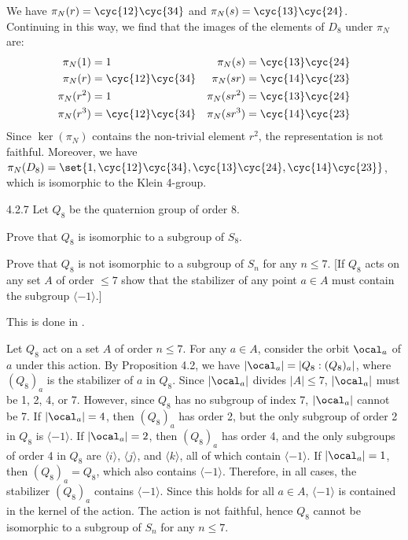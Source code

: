 \begin{sol}
	We have $\pi_N(r) = \cyc{1 2}\cyc{3 4}$ and $\pi_N(s) = \cyc{1 3}\cyc{2 4}$.
	Continuing in this way, we find that the images of the elements of $D_8$ under $\pi_N$ are:
	\begin{align*}
		\pi_N(1) & = 1 & \pi_N(s) & = \cyc{1 3}\cyc{2 4} \\
		\pi_N(r) & = \cyc{1 2}\cyc{3 4} & \pi_N(sr) & = \cyc{1 4}\cyc{2 3} \\
		\pi_N(r^2) & = 1 & \pi_N(sr^2) & = \cyc{1 3}\cyc{2 4} \\
		\pi_N(r^3) & = \cyc{1 2}\cyc{3 4} & \pi_N(sr^3) & = \cyc{1 4}\cyc{2 3}
	\end{align*}
	Since $\ker(\pi_N)$ contains the non-trivial element $r^2$, the representation is not faithful.
	Moreover, we have $\pi_N(D_8) = \set{1, \cyc{1 2}\cyc{3 4}, \cyc{1 3}\cyc{2 4}, \cyc{1 4}\cyc{2 3}}$, which is isomorphic to the Klein 4-group.
\end{sol}

\begin{exercise}{4.2.7}
	Let $Q_8$ be the quaternion group of order 8.
	\begin{subexercises}
		\item Prove that $Q_8$ is isomorphic to a subgroup of $S_8$.
		\item Prove that $Q_8$ is not isomorphic to a subgroup of $S_n$ for any $n \le 7$. [If $Q_8$ acts on any set $A$ of order $\le 7$ show that the stabilizer of any point $a \in A$ must contain the subgroup $\langle -1 \rangle$.]
	\end{subexercises}
\end{exercise}

\begin{solenum}
	\item This is done in .
	\item Let $Q_8$ act on a set $A$ of order $n \leq 7$.
	For any $a \in A$, consider the orbit $\ocal_a$ of $a$ under this action.
	By Proposition 4.2, we have $|\ocal_a| = |Q_8 : (Q_8)_a|$, where $(Q_8)_a$ is the stabilizer of $a$ in $Q_8$.
	Since $|\ocal_a|$ divides $|A| \leq 7$, $|\ocal_a|$ must be 1, 2, 4, or 7.
	However, since $Q_8$ has no subgroup of index 7, $|\ocal_a|$ cannot be 7.
	If $|\ocal_a| = 4$, then $(Q_8)_a$ has order 2, but the only subgroup of order 2 in $Q_8$ is $\langle -1 \rangle$.
	If $|\ocal_a| = 2$, then $(Q_8)_a$ has order 4, and the only subgroups of order 4 in $Q_8$ are $\langle i \rangle$, $\langle j \rangle$, and $\langle k \rangle$, all of which contain $\langle -1 \rangle$.
	If $|\ocal_a| = 1$, then $(Q_8)_a = Q_8$, which also contains $\langle -1 \rangle$.
	Therefore, in all cases, the stabilizer $(Q_8)_a$ contains $\langle -1 \rangle$.
	Since this holds for all $a \in A$, $\langle -1 \rangle$ is contained in the kernel of the action.
	The action is not faithful, hence $Q_8$ cannot be isomorphic to a subgroup of $S_n$ for any $n \leq 7$.
\end{solenum}

